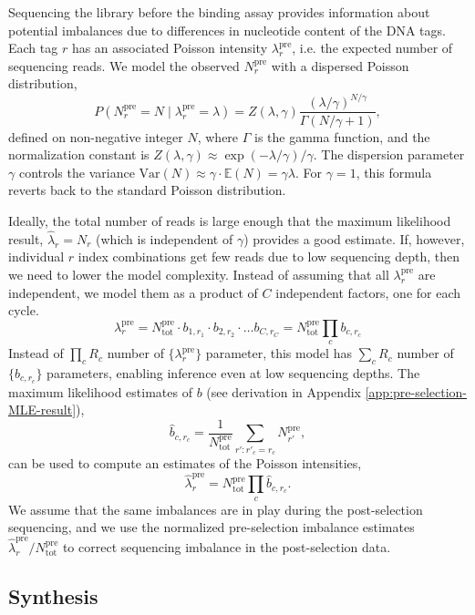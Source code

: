 \documentclass[letter,10pt,oneside]{article}
\newcommand{\bel}{\begin{equation}}
\newcommand{\eel}{\end{equation}}
\newcommand{\+}{^\dagger}
\begin{document}
Sequencing the library before the binding assay provides information about potential imbalances due to differences in nucleotide content of the DNA tags. Each tag $r$ has an associated Poisson intensity $\lambda^\text{pre}_r$, i.e. the expected number of sequencing reads. We model the observed $N^\text{pre}_r$ with a dispersed Poisson distribution,
\bel
  \label{eq:dispersed-Poisson}
  P(N^\text{pre}_r = N \;|\; \lambda^\text{pre}_r = \lambda) = Z(\lambda, \gamma) \frac{(\lambda / \gamma)^{N/\gamma}}{\Gamma(N/\gamma + 1)},
\eel
defined on non-negative integer $N$, where $\Gamma$ is the gamma function, and the normalization constant is $Z(\lambda, \gamma) \approx \exp(-\lambda / \gamma) / \gamma$. The dispersion parameter $\gamma$ controls the variance $\text{Var}(N) \approx \gamma \cdot \mathbb{E}(N) = \gamma \lambda$. For $\gamma = 1$, this formula reverts back to the standard Poisson distribution. 

Ideally, the total number of reads is large enough that the maximum likelihood result, $\hat\lambda_r = N_r$ (which is independent of $\gamma$) provides a good estimate. If, however, individual $r$ index combinations get few reads due to low sequencing depth, then we need to lower the model complexity. Instead of assuming that all $\lambda_r^{\text{pre}}$ are independent, we model them as a product of $C$ independent factors, one for each cycle. 
\bel
  \label{eq:b-factors}
  \lambda_r^\text{pre} = N^\text{pre}_\text{tot}\cdot b_{1, r_1}\cdot b_{2, r_2}\cdot \ldots b_{C, r_C} = N^\text{pre}_\text{tot}\prod _c b_{c, r_c}
\eel
Instead of $\prod_c R_c$ number of $\{\lambda_r^\text{pre}\}$ parameter, this model has $\sum_c R_c$ number of $\{b_{c, r_c}\}$ parameters, enabling inference even at low sequencing depths. The maximum likelihood estimates of $b$ (see derivation in Appendix \ref{app:pre-selection-MLE-result}),
\bel
\label{eq:b-factor-MLE}
  \hat b_{c, r_c} = \frac{1}{N^\text{pre}_\text{tot}}\sum_{r': r'_c = r_c} N^\text{pre}_{r'},
\eel
can be used to compute an estimates of the Poisson intensities,
\bel
  \hat \lambda^\text{pre}_r = N^\text{pre}_\text{tot}\prod _c \hat b_{c, r_c}.
\eel
We assume that the same imbalances are in play during the post-selection sequencing, and we use the normalized pre-selection imbalance estimates $\hat \lambda^\text{pre}_r / N^\text{pre}_\text{tot}$ to correct sequencing imbalance in the post-selection data.


\subsection{Synthesis}
\end{document}
